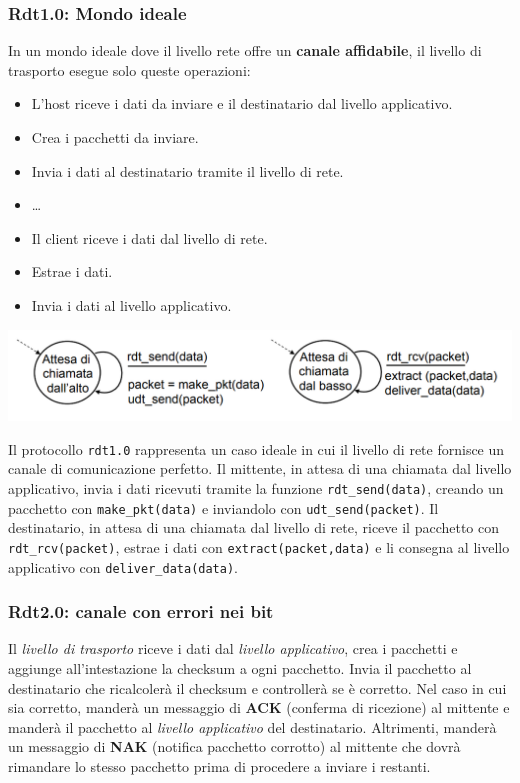 \subsubsection*{Rdt1.0: Mondo ideale}
In un mondo ideale dove il livello rete offre un \textbf{canale affidabile}, il livello di trasporto esegue solo queste operazioni:
\begin{itemize}
  \item L'host riceve i dati da inviare e il destinatario dal livello applicativo.
  \item Crea i pacchetti da inviare.
  \item Invia i dati al destinatario tramite il livello di rete.
  \item \dots
  \item Il client riceve i dati dal livello di rete.
  \item Estrae i dati.
  \item Invia i dati al livello applicativo.
\end{itemize}

\begin{center}
\includegraphics[width=\textwidth]{./img/rdt1.0.png}
\end{center}

Il protocollo \texttt{rdt1.0} rappresenta un caso ideale in cui il livello di rete fornisce un canale di comunicazione perfetto. Il mittente, in attesa di una chiamata dal livello applicativo, invia i dati ricevuti tramite la funzione \texttt{rdt\_send(data)}, creando un pacchetto con \texttt{make\_pkt(data)} e inviandolo con \texttt{udt\_send(packet)}. Il destinatario, in attesa di una chiamata dal livello di rete, riceve il pacchetto con \texttt{rdt\_rcv(packet)}, estrae i dati con \texttt{extract(packet,data)} e li consegna al livello applicativo con \texttt{deliver\_data(data)}.

\subsubsection*{Rdt2.0: canale con errori nei bit}
Il \textit{livello di trasporto} riceve i dati dal \textit{livello applicativo}, crea i pacchetti e aggiunge all'intestazione la checksum a ogni pacchetto.
Invia il pacchetto al destinatario che ricalcolerà il checksum e controllerà se è corretto. Nel caso in cui sia corretto, manderà un messaggio di \textbf{ACK} (conferma di ricezione) al mittente e manderà il pacchetto al \textit{livello applicativo} del destinatario. Altrimenti, manderà un messaggio di \textbf{NAK} (notifica pacchetto corrotto) al mittente che dovrà rimandare lo stesso pacchetto prima di procedere a inviare i restanti.

